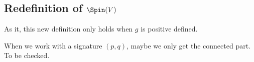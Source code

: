 
\subsection{Redefinition of \texorpdfstring{$\Spin(V)$}{Spin(V)}}

As it, this new definition only holds when $g$ is positive defined.

\begin{probleme}
	When we work with a signature $(p,q)$, maybe we only get the connected part. To be checked.
\end{probleme}

